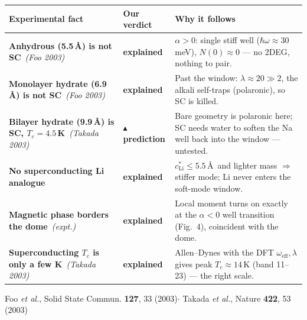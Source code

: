 \documentclass[border=8pt,varwidth=17.4cm]{standalone}
\newcommand{\vok}{{\color{good}\ding{51}}\;\textbf{\color{good}explained}}
\newcommand{\vpred}{{\color{amber}$\blacktriangle$}\;\textbf{\color{amber}prediction}}
\newcommand{\srcref}[1]{\ {\footnotesize\itshape\color{sec}(#1)}}
\begin{document}
{\renewcommand{\arraystretch}{1.5}%
%
\begin{tabularx}{\linewidth}{@{}%
    >{\raggedright\arraybackslash}p{5.05cm}%
    >{\raggedright\arraybackslash}p{2.75cm}%
    >{\raggedright\arraybackslash}X@{}}
\toprule
\textbf{Experimental fact} & \textbf{Our verdict} & \textbf{Why it follows}\\
\midrule
\textbf{Anhydrous (5.5\,\AA) is not SC}\srcref{Foo 2003} & \vok &
  $\alpha>0$: single stiff well ($\hbar\omega\!\approx\!30$\,meV),
  $N(0)\!\approx\!0$ --- no 2DEG, nothing to pair.\\
\textbf{Monolayer hydrate (6.9\,\AA) is not SC}\srcref{Foo 2003} & \vok &
  Past the window: $\lambda\!\approx\!20\!\gg\!2$, the alkali self-traps
  (polaronic), so SC is killed.\\
\textbf{Bilayer hydrate (9.9\,\AA) is SC, $T_c\!=\!4.5$\,K}\srcref{Takada 2003}
  & \vpred &
  Bare geometry is polaronic here; SC needs water to soften the Na well
  back into the window --- untested.\\
\textbf{No superconducting Li analogue} & \vok &
  $c^{\ast}_{\mathrm{Li}}\!\le\!5.5$\,\AA\ and lighter mass $\Rightarrow$
  stiffer mode; Li never enters the soft-mode window.\\
\textbf{Magnetic phase borders the dome}\srcref{expt.} & \vok &
  Local moment turns on exactly at the $\alpha<0$ well transition (Fig.~4),
  coincident with the dome.\\
\textbf{Superconducting $T_c$ is only a few K}\srcref{Takada 2003} & \vok &
  Allen--Dynes with the DFT $\omega_{\mathrm{eff}},\lambda$ gives peak
  $T_c\!\approx\!14$\,K (band 11--23) --- the right scale.\\
\bottomrule
\end{tabularx}}%

\vspace{2pt}
{\footnotesize\color{sec}Foo \textit{et al.}, Solid State Commun.
\textbf{127}, 33 (2003)\quad$\cdot$\quad
Takada \textit{et al.}, Nature \textbf{422}, 53 (2003)}
\end{document}
